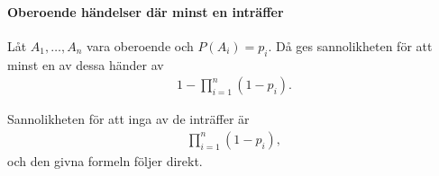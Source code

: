\paragraph{Oberoende händelser där minst en inträffer}
Låt $A_1, \dots, A_n$ vara oberoende och $P(A_i) = p_i$. Då ges sannolikheten för att minst en av dessa händer av
\begin{align*}
	1 - \prod\limits_{i = 1}^{n}(1 - p_i).
\end{align*}

\proof
Sannolikheten för att inga av de inträffer är
\begin{align*}
	\prod\limits_{i = 1}^{n}(1 - p_i),
\end{align*}
och den givna formeln följer direkt.